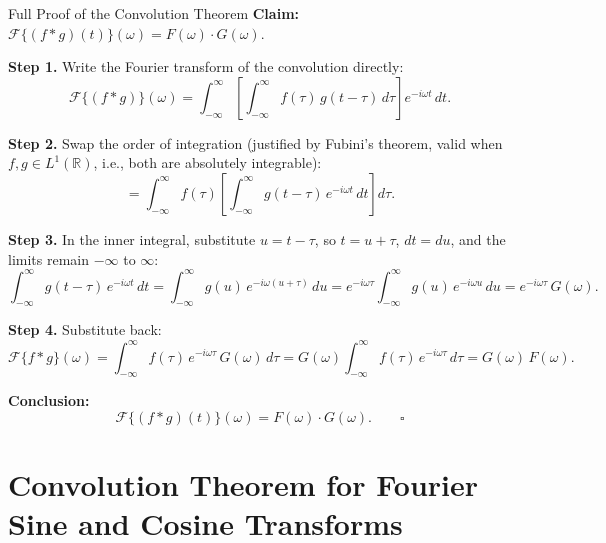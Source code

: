 \documentclass[12pt,a4paper]{article}
\begin{document}
\begin{infobox}{Full Proof of the Convolution Theorem}
\textbf{Claim:} $\mathcal{F}\{(f*g)(t)\}(\omega) = F(\omega)\cdot G(\omega)$.

\medskip
\textbf{Step 1.} Write the Fourier transform of the convolution directly:
\[
  \mathcal{F}\{(f*g)\}(\omega)
  = \int_{-\infty}^{\infty}
      \left[\int_{-\infty}^{\infty} f(\tau)\,g(t-\tau)\,d\tau\right]
    e^{-i\omega t}\,dt.
\]

\textbf{Step 2.} Swap the order of integration (justified by Fubini's theorem,
valid when $f,g \in L^1(\mathbb{R})$, i.e., both are absolutely integrable):
\[
  = \int_{-\infty}^{\infty} f(\tau)
      \left[\int_{-\infty}^{\infty} g(t-\tau)\,e^{-i\omega t}\,dt\right]
    d\tau.
\]

\textbf{Step 3.} In the inner integral, substitute $u = t - \tau$, so $t = u+\tau$,
$dt = du$, and the limits remain $-\infty$ to $\infty$:
\[
  \int_{-\infty}^{\infty} g(t-\tau)\,e^{-i\omega t}\,dt
  = \int_{-\infty}^{\infty} g(u)\,e^{-i\omega(u+\tau)}\,du
  = e^{-i\omega\tau}\int_{-\infty}^{\infty} g(u)\,e^{-i\omega u}\,du
  = e^{-i\omega\tau}\,G(\omega).
\]

\textbf{Step 4.} Substitute back:
\[
  \mathcal{F}\{f*g\}(\omega)
  = \int_{-\infty}^{\infty} f(\tau)\,e^{-i\omega\tau}\,G(\omega)\,d\tau
  = G(\omega)\int_{-\infty}^{\infty} f(\tau)\,e^{-i\omega\tau}\,d\tau
  = G(\omega)\,F(\omega).
\]

\textbf{Conclusion:}
\[
  \mathcal{F}\{(f*g)(t)\}(\omega) = F(\omega)\cdot G(\omega). \qquad \square
\]
\end{infobox}

\section{Convolution Theorem for Fourier Sine and Cosine Transforms}
\end{document}

